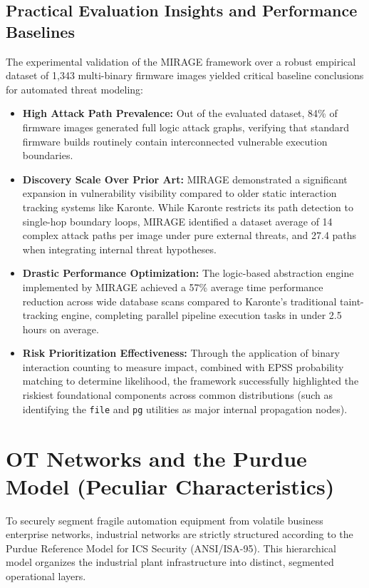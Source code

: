 \documentclass[target=mst,aauheader=aics,style=]{thud}
\begin{document}
\subsection{Practical Evaluation Insights and Performance Baselines}
The experimental validation of the MIRAGE framework over a robust empirical dataset of 1,343 multi-binary firmware images yielded critical baseline conclusions for automated threat modeling: 
\begin{itemize}
    \item \textbf{High Attack Path Prevalence:} Out of the evaluated dataset, 84\% of firmware images generated full logic attack graphs, verifying that standard firmware builds routinely contain interconnected vulnerable execution boundaries. 
    \item \textbf{Discovery Scale Over Prior Art:} MIRAGE demonstrated a significant expansion in vulnerability visibility compared to older static interaction tracking systems like Karonte. While Karonte restricts its path detection to single-hop boundary loops, MIRAGE identified a dataset average of 14 complex attack paths per image under pure external threats, and 27.4 paths when integrating internal threat hypotheses. 
    \item \textbf{Drastic Performance Optimization:} The logic-based abstraction engine implemented by MIRAGE achieved a 57\% average time performance reduction across wide database scans compared to Karonte's traditional taint-tracking engine, completing parallel pipeline execution tasks in under 2.5 hours on average. 
    \item \textbf{Risk Prioritization Effectiveness:} Through the application of binary interaction counting to measure impact, combined with EPSS probability matching to determine likelihood, the framework successfully highlighted the riskiest foundational components across common distributions (such as identifying the \texttt{file} and \texttt{pg} utilities as major internal propagation nodes). 
\end{itemize}

\section{OT Networks and the Purdue Model (Peculiar Characteristics)}
To securely segment fragile automation equipment from volatile business enterprise networks, industrial networks are strictly structured according to the Purdue Reference Model for ICS Security (ANSI/ISA-95). This hierarchical model organizes the industrial plant infrastructure into distinct, segmented operational layers.
\end{document}
